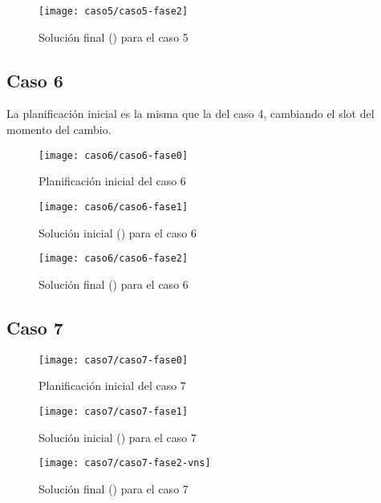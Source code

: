 \begin{figure}[!h]
	\centering
	\texttt{[image: caso5/caso5-fase2]}
	\caption{Solución final (\fasedos{}) para el caso 5}
	\label{fig:caso5-fase2}
\end{figure}

\FloatBarrier
\newpage
\subsection{Caso 6}

La planificación inicial es la misma que la del caso 4, cambiando el slot del momento del cambio.

\begin{figure}[!h]
	\centering
	\texttt{[image: caso6/caso6-fase0]}
	\caption{Planificación inicial del caso 6}
	\label{fig:caso6-fase0}
\end{figure}

\begin{figure}[!h]
	\centering
	\texttt{[image: caso6/caso6-fase1]}
	\caption{Solución inicial (\faseuno{}) para el caso 6}
	\label{fig:caso6-fase1}
\end{figure}

\begin{figure}[!h]
	\centering
	\texttt{[image: caso6/caso6-fase2]}
	\caption{Solución final (\fasedos{}) para el caso 6}
	\label{fig:caso6-fase2}
\end{figure}

\FloatBarrier
\newpage
\subsection{Caso 7}

\begin{figure}[!h]
	\centering
	\texttt{[image: caso7/caso7-fase0]}
	\caption{Planificación inicial del caso 7}
	\label{fig:caso7-fase0}
\end{figure}

\begin{figure}[!h]
	\centering
	\texttt{[image: caso7/caso7-fase1]}
	\caption{Solución inicial (\faseuno{}) para el caso 7}
	\label{fig:caso7-fase1}
\end{figure}

\begin{figure}[!h]
	\centering
	\texttt{[image: caso7/caso7-fase2-vns]}
	\caption{Solución final (\fasedos{}) para el caso 7}
	\label{fig:caso7-fase2}
\end{figure}

